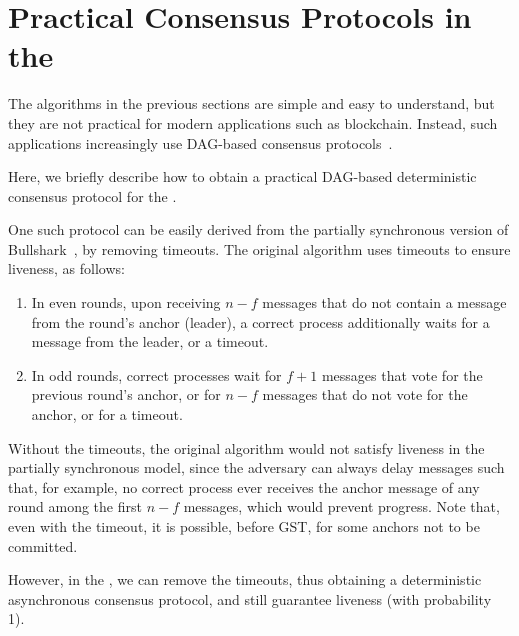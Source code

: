 \section{Practical Consensus Protocols in the \model}
\label{sec:practical}

The algorithms in the previous sections are simple and easy to understand, but they are not practical for modern applications such as blockchain. Instead, such applications increasingly use DAG-based consensus protocols~\cite{mysticeti, bullshark, narwhal}. 

Here, we briefly describe how to obtain a practical DAG-based deterministic consensus protocol for the \model.

One such protocol can be easily derived from the partially synchronous version of Bullshark~\cite{PSBullshark}, by removing timeouts. The original algorithm uses timeouts to ensure liveness, as follows: 
\begin{enumerate}
    \item In even rounds, upon receiving $n-f$ messages that do not contain a message from the round's anchor (leader), a correct process additionally waits for a message from the leader, or a timeout.
    \item In odd rounds, correct processes wait for $f+1$ messages that vote for the previous round's anchor, or for $n-f$ messages that do not vote for the anchor, or for a timeout.
\end{enumerate} 

Without the timeouts, the original algorithm would not satisfy liveness in the partially synchronous model, since the adversary can always delay messages such that, for example, no correct process ever receives the anchor message of any round among the first $n-f$ messages, which would prevent progress. Note that, even with the timeout, it is possible, before GST, for some anchors not to be committed.

However, in the \model, we can remove the timeouts, thus obtaining a deterministic asynchronous consensus protocol, and still guarantee liveness (with probability 1). 


